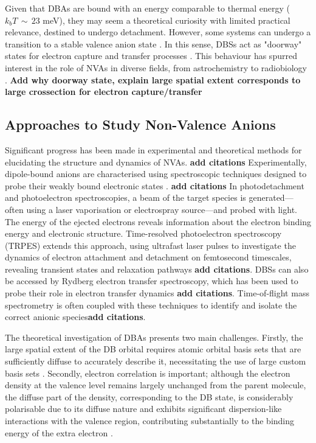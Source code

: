 Given that DBAs are bound with an energy comparable to thermal energy ($k_bT\,\sim\,23$ meV), they may seem a theoretical curiosity with limited practical relevance, destined to undergo detachment. However, some systems can undergo a transition to a stable valence anion state \cite{herbert2015quantum,jordan2003theory}. In this sense, DBSs act as "doorway" states for electron capture and transfer processes \cite{sommerfeld2002coupling,jordan2003theory,kang2024reaction}. This behaviour has spurred interest in the role of NVAs in diverse fields, from astrochemistry \cite{fortenberry2015interstellar} to radiobiology \cite{narayanan2023secondary,sedmidubska2024interaction}. \textbf{Add why doorway state, explain large spatial extent corresponds to large crossection for electron capture/transfer}
\subsection{Approaches to Study Non-Valence Anions}
Significant progress has been made in experimental and theoretical methods for elucidating the structure and dynamics of NVAs. \textbf{add citations} Experimentally, dipole-bound anions are characterised using spectroscopic techniques designed to probe their weakly bound electronic states \cite{simons2008molecular}. \textbf{add citations} In photodetachment and photoelectron spectroscopies, a beam of the target species is generated—often using a laser vaporisation or electrospray source—and probed with light. The energy of the ejected electrons reveals information about the electron binding energy and electronic structure. Time-resolved photoelectron spectroscopy (TRPES) extends this approach, using ultrafast laser pulses to investigate the dynamics of electron attachment and detachment on femtosecond timescales, revealing transient states and relaxation pathways \cite{clarke2024dynamics}\textbf{add citations}. DBSs can also be accessed by Rydberg electron transfer spectroscopy, which has been used to probe their role in electron transfer dynamics \cite{bradforth2002excited}\textbf{add citations}. Time-of-flight mass spectrometry is often coupled with these techniques to identify and isolate the correct anionic species\textbf{add citations}.

The theoretical investigation of DBAs presents two main challenges. Firstly, the large spatial extent of the DB orbital requires atomic orbital basis sets that are sufficiently diffuse to accurately describe it, necessitating the use of large custom basis sets \cite{skurski2000choose}. Secondly, electron correlation is important; although the electron density at the valence level remains largely unchanged from the parent molecule, the diffuse part of the density, corresponding to the DB state, is considerably polarisable due to its diffuse nature and exhibits significant dispersion-like interactions with the valence region, contributing substantially to the binding energy of the extra electron \cite{simons2008molecular,simons2023molecular,gutowski1996contribution}.

